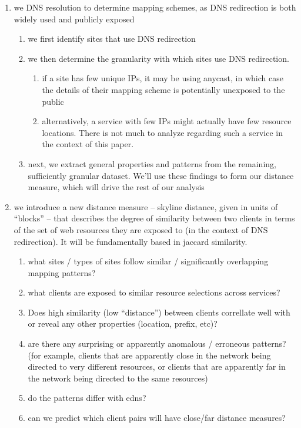 \documentclass[10pt, sigconf]{acmart}
\begin{document}
\begin{enumerate}
    \item we DNS resolution to determine mapping schemes, as DNS redirection is
        both widely used and publicly exposed
        \begin{enumerate}
            \item we first identify sites that use DNS redirection 
            \item we then determine the granularity with which sites use DNS
                redirection.
                \begin{enumerate}
                    \item if a site has few unique IPs, it may be using anycast,
                        in which case the details of their mapping scheme is
                        potentially unexposed to the public 
                    \item alternatively, a service with few IPs might actually
                        have few resource locations. There
                        is not much to analyze regarding such a service in the
                        context of this paper.
                \end{enumerate}
            \item next, we extract general properties and patterns from the
                remaining, sufficiently granular dataset. We'll use these
                findings to form our distance measure, which will drive the rest
                of our analysis
        \end{enumerate}
    \item we introduce a new distance measure -- skyline distance, given in units of
        ``blocks'' -- that describes the degree of similarity
        between two clients in terms of the set of web resources they are
        exposed to (in the context of DNS redirection). It will be fundamentally
        based in jaccard similarity. 
        \begin{enumerate}
            \item what sites / types of sites follow similar / significantly
                overlapping mapping patterns?
            \item what clients are exposed to similar resource selections across
                services? 
            \item Does high similarity (low ``distance'') between clients
                correllate well with or reveal any other properties (location, prefix,
                etc)?
            \item are there any surprising or apparently anomalous / erroneous
                patterns? (for example, clients that are apparently close in the
                network being directed to very different resources, or clients
                that are apparently far in the network being directed to the
                same resources) 
            \item do the patterns differ with edns?
            \item can we predict which client pairs will have close/far distance
                measures? 
        \end{enumerate}
\end{enumerate}

\clearpage


 
\end{document}
